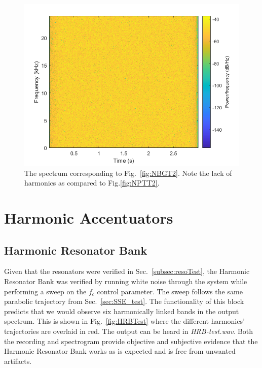 \documentclass[../main.tex]{subfiles}
\begin{document}
\begin{figure}[hb]
    \centering
    \includegraphics[scale=.65]{./images/plots/NBGTest2Spectrum.png}
    \caption{The spectrum corresponding to Fig.~\ref{fig:NBGT2}. Note the lack of harmonics as compared to Fig.\ref{fig:NPTT2}.}
    \label{fig:NBGT2Spec}
\end{figure}

\clearpage

\section{Harmonic Accentuators}
\subsection{Harmonic Resonator Bank}
Given that the resonators were verified in Sec.~\ref{subsec:resoTest}, the Harmonic Resonator Bank was verified by running white noise through the system while performing a sweep on the $f_c$ control parameter. The sweep follows the same parabolic trajectory from Sec.~\ref{sec:SSE_test}. The functionality of this block predicts that we would observe six harmonically linked bands in the output spectrum. This is shown in Fig.~\ref{fig:HRBTest} where the different harmonics' trajectories are overlaid in red. The output can be heard in \emph{HRB-test.wav}. Both the recording and spectrogram provide objective and subjective evidence that the Harmonic Resonator Bank works as is expected and is free from unwanted artifacts.
\end{document}
